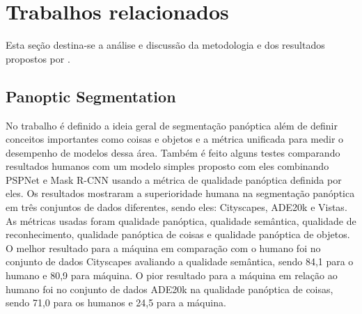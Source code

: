 \section{Trabalhos relacionados}

Esta seção destina-se a análise e discussão da metodologia e dos resultados propostos por .



\subsection*{Panoptic Segmentation}

No trabalho  é definido a ideia geral de segmentação panóptica além de definir conceitos importantes como coisas e objetos e a métrica unificada para medir o desempenho de modelos dessa área. Também é feito alguns testes comparando resultados humanos com um modelo simples proposto com eles combinando PSPNet e Mask R-CNN usando a métrica de qualidade panóptica definida por eles. Os resultados mostraram a superioridade humana na segmentação panóptica em três conjuntos de dados diferentes, sendo eles: Cityscapes, ADE20k e Vistas. As métricas usadas foram qualidade panóptica, qualidade semântica, qualidade de reconhecimento, qualidade panóptica
 de coisas e qualidade panóptica de objetos. O melhor resultado para a máquina em comparação com o humano foi no conjunto de dados Cityscapes avaliando a qualidade semântica, sendo 84,1 para o humano e 80,9 para máquina. O pior resultado para a máquina em relação ao humano foi no conjunto de dados ADE20k na qualidade panóptica de coisas, sendo 71,0 para os humanos e 24,5 para a máquina.

